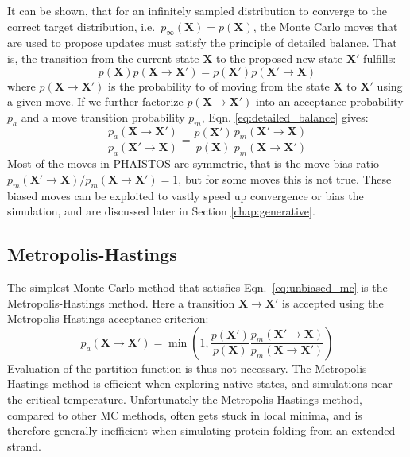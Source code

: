It can be shown, that for an infinitely sampled distribution to converge to the correct target distribution, i.e.~$p_\infty(\mathbf X) = p(\mathbf X)$, the Monte Carlo moves that are used to propose updates must satisfy the principle of detailed balance.
That is, the transition from the current state $\mathbf{X}$ to the proposed new state $\mathbf{X'}$ fulfills:
\begin{equation}
    \label{eq:detailed_balance}
    p(\mathbf{X}) p(\mathbf{X} \rightarrow \mathbf{X'}) = 
    p(\mathbf{X'}) p(\mathbf{X'} \rightarrow \mathbf{X})
\end{equation}
where $p(\mathbf{X} \rightarrow \mathbf{X'})$ is the probability to of moving from the state $\mathbf{X}$ to $\mathbf{X'}$ using a given move.
If we further factorize $p(\mathbf{X} \rightarrow \mathbf{X'})$ into an acceptance probability $p_a$ and a move transition probability $p_m$, Eqn. \ref{eq:detailed_balance} gives:
\begin{equation}
    \label{eq:unbiased_mc}
    \frac{p_a(\mathbf{X} \rightarrow \mathbf{X'})}
         {p_a(\mathbf{X'} \rightarrow \mathbf{X})} =
    \frac{p(\mathbf{X'})}
         {p(\mathbf{X})}
    \frac{p_m(\mathbf{X'} \rightarrow \mathbf{X})}
         {p_m(\mathbf{X} \rightarrow \mathbf{X'})}
\end{equation}
Most of the moves in PHAISTOS are symmetric, that is the move bias ratio $p_m(\mathbf{X'} \rightarrow \mathbf{X}) / p_m(\mathbf{X} \rightarrow \mathbf{X'}) = 1$, but for some moves this is not true. 
These biased moves can be exploited to vastly speed up convergence or bias the simulation, and are discussed later in Section \ref{chap:generative}.

\subsection{Metropolis-Hastings}
The simplest Monte Carlo method that satisfies Eqn.~\ref{eq:unbiased_mc} is the Metropolis-Hastings method.
Here a transition $\mathbf{X} \rightarrow \mathbf{X'}$ is accepted using the Metropolis-Hastings acceptance criterion:
\begin{equation}
    \label{eq:mc_mh}
    p_a(\mathbf{X} \rightarrow \mathbf{X'}) = \min \left( 1,
    \frac{p(\mathbf{X'})}
         {p(\mathbf{X})}
    \frac{p_m(\mathbf{X'} \rightarrow \mathbf{X})}
         {p_m(\mathbf{X} \rightarrow \mathbf{X'})} \right)
\end{equation}
Evaluation of the partition function is thus not necessary.
The Metropolis-Hastings method is efficient when exploring native states, and simulations near the critical temperature.
Unfortunately the Metropolis-Hastings method, compared to other MC methods, often gets stuck in local minima, and is therefore generally inefficient when simulating protein folding from an extended strand.

